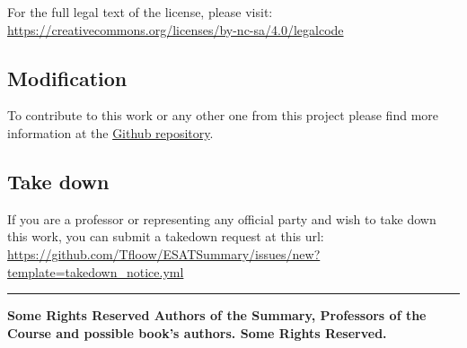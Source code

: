 \documentclass[
  a4paper,
  ,captions=tableheading
]{scrartcl}
\begin{document}
For the full legal text of the license, please visit:
\url{https://creativecommons.org/licenses/by-nc-sa/4.0/legalcode}

\subsection{Modification}\label{modification}

To contribute to this work or any other one from this project please
find more information at the
\href{https://github.com/Tfloow/ESATSummary}{Github repository}.

\subsection{Take down}\label{take-down}

If you are a professor or representing any official party and wish to
take down this work, you can submit a takedown request at this url:
\url{https://github.com/Tfloow/ESATSummary/issues/new?template=takedown_notice.yml}

\begin{center}\rule{0.5\linewidth}{0.5pt}\end{center}

\textbf{Some Rights Reserved \the\year{} Authors of the Summary,
Professors of the Course and possible book's authors. Some Rights
Reserved.}
\end{document}
